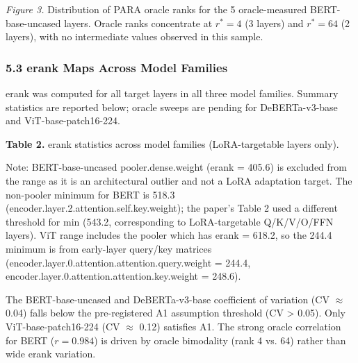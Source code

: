 \textit{Figure 3.} Distribution of PARA oracle ranks for the 5 oracle-measured BERT-base-uncased layers. Oracle ranks concentrate at $r^* = 4$ (3 layers) and $r^* = 64$ (2 layers), with no intermediate values observed in this sample.

\subsubsection{5.3 erank Maps Across Model Families}

erank was computed for all target layers in all three model families. Summary statistics are reported below; oracle sweeps are pending for DeBERTa-v3-base and ViT-base-patch16-224.

\textbf{Table 2.} erank statistics across model families (LoRA-targetable layers only).

\begin{table}[htbp]
\centering
{}
\end{table}

Note: BERT-base-uncased pooler.dense.weight (erank = 405.6) is excluded from the range as it is an architectural outlier and not a LoRA adaptation target. The non-pooler minimum for BERT is 518.3 (encoder.layer.2.attention.self.key.weight); the paper's Table 2 used a different threshold for min (543.2, corresponding to LoRA-targetable Q/K/V/O/FFN layers). ViT range includes the pooler which has erank = 618.2, so the 244.4 minimum is from early-layer query/key matrices (encoder.layer.0.attention.attention.query.weight = 244.4, encoder.layer.0.attention.attention.key.weight = 248.6).

The BERT-base-uncased and DeBERTa-v3-base coefficient of variation (CV $\approx$ 0.04) falls below the pre-registered A1 assumption threshold (CV > 0.05). Only ViT-base-patch16-224 (CV $\approx$ 0.12) satisfies A1. The strong oracle correlation for BERT ($r = 0.984$) is driven by oracle bimodality (rank 4 vs. 64) rather than wide erank variation.

